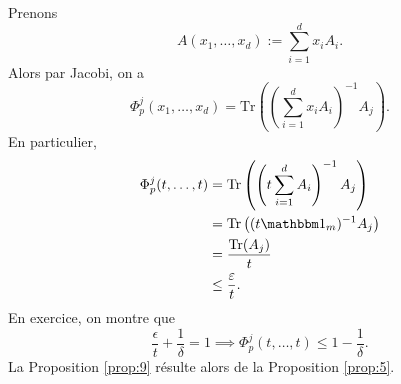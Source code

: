 \begin{preuve}
\begin{enumerate}
    Prenons 
    \[ A(x_1, \ldots , x_d) := \sum_{i=1}^{d} x_i A_i. \]
    Alors par Jacobi, on a 
    \[ \Phi_p^j(x_1, \ldots , x_d) = \mathrm{Tr} \left( \left( \sum_{i=1}^{d}x_i A_i \right)^{-1} A_j
      \right). \]
    En particulier, 
    \begin{align*}
      \Phi_p^j(t, \ldots , t) &= \mathrm{Tr} \left( \left( t \sum_{i=1}^{d}A_i \right)^{-1} A_j \right)\\
                              &= \mathrm{Tr}\left( (t \un_m)^{-1} A_j \right)\\
                              &= \frac{\mathrm{Tr}(A_j)}{t}\\
                              &\leq \frac{\epsilon}{t}.
    \end{align*}
    En exercice, on montre que 
    \[ \frac{\epsilon}{t} + \frac{1}{\delta} = 1 \implies \Phi_p^j(t, \ldots ,t) \leq 1 - \frac{1}{\delta}. \]
    La Proposition \ref{prop:9} résulte alors de la Proposition \ref{prop:5}.
  \end{enumerate}
\end{preuve}


